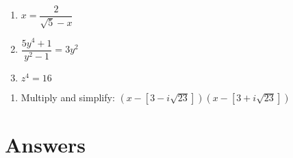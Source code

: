 \documentclass[11pt]{article}
\theoremstyle{definition}  %
\newcounter{HW}
\begin{document}
\begin{multicols}{3}
\begin{enumerate}
\setcounter{enumi}{\value{HW}}

\item  $x =\dfrac{2}{\sqrt{5} - x}$
\item  $\dfrac{5y^4 + 1}{y^2-1} = 3y^2$
\item  $z^{4} = 16$  \label{solvecomplexlast}

\setcounter{HW}{\value{enumi}}
\end{enumerate}
\end{multicols}


\begin{enumerate}
\setcounter{enumi}{\value{HW}}

\item  Multiply and simplify:  $\left(x - [3 - i\sqrt{23}]\right)\left(x - [3+i\sqrt{23}]\right)$

\end{enumerate}


\newpage

\section{Answers}
\end{document}
